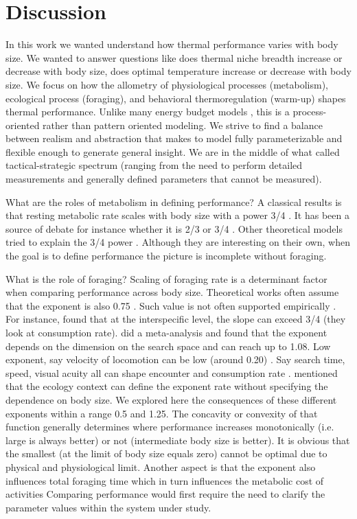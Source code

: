 \section*{Discussion}
In this work we wanted understand how thermal performance varies with body size.
We wanted to answer questions like does thermal niche breadth increase or decrease with body size, does optimal temperature increase or decrease with body size.
We focus on how the allometry of physiological processes (metabolism), ecological process (foraging), and behavioral thermoregulation (warm-up) shapes thermal performance. 
Unlike many energy budget models \citep[e.g.,][]{Brown1993,Kooijmann2009}, this is a process-oriented rather than pattern oriented modeling.
We strive to find a balance between realism and abstraction that makes to model fully parameterizable and flexible enough to generate general insight.
We are in the middle of what \citet{Hooling1966} called tactical-strategic spectrum (ranging from the need to perform detailed measurements and generally defined parameters that cannot be measured).

What are the roles of metabolism in defining performance?
A classical results is that resting metabolic rate scales with body size with a power 3/4  \citep{Kleiber1947, Peters1986, Brown2004}.
It has been a source of debate for instance whether it is 2/3 or 3/4 \citep[for refs][]{Yodzis1992, Isaac2010}.
Other theoretical models tried to explain the 3/4 power \citep[e.g.,][]{West1997, Kozlowski1997}.
Although they are interesting on their own, when the goal is to define performance the picture is incomplete without foraging.

What is the role of foraging?
Scaling of foraging rate is a determinant factor when comparing performance across body size.
Theoretical works often assume that the exponent is also 0.75 \citep{Yodzis1992, Brown1993}.
Such value is not often supported empirically .
For instance, \citet{Maino2015} found that at the interspecific level, the slope can exceed 3/4 (they look at consumption rate).
\citet{Pawar2012} did a meta-analysis and found that the exponent depends on the dimension on the search space and can reach up to 1.08.
Low exponent, say velocity of locomotion can be low (around 0.20)  \citep{Peters1986}.
Say search time, speed, visual acuity all can shape encounter and consumption rate \citep[ref in][]{Kalinkat2015}.
\citet{Yodzis1992} mentioned that the ecology context can define the exponent rate without specifying the dependence on body size.
We explored here the consequences of these different exponents within a range 0.5 and 1.25.
The concavity or convexity of that function generally determines where performance increases monotonically (i.e. large is always better) or not (intermediate body size is better).
It is obvious that the smallest (at the limit of body size equals zero) cannot be optimal due to physical and physiological limit.
Another aspect is that the exponent also influences total foraging time which in turn influences the metabolic cost of activities
Comparing performance would first require the need to clarify the parameter values within the system under study.

